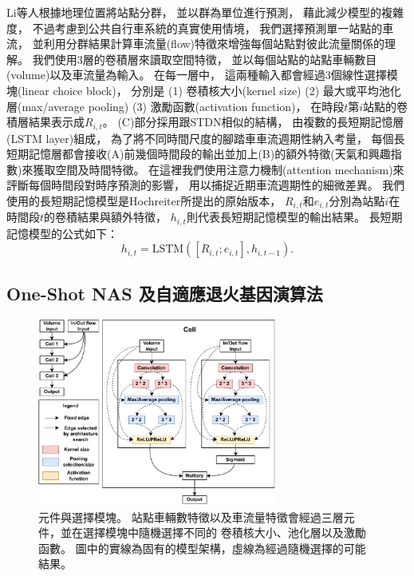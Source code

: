 \documentclass[a4paper,14pt]{extarticle}
\begin{document}
            Li等人\cite{li2015traffic}根據地理位置將站點分群，
            並以群為單位進行預測，
            藉此減少模型的複雜度，
            不過考慮到公共自行車系統的真實使用情境，
            我們選擇預測單一站點的車流，
            並利用分群結果計算車流量(flow)特徵來增強每個站點對彼此流量關係的理解。
            我們使用3層的卷積層來讀取空間特徵，
            並以每個站點的站點車輛數目(volume)以及車流量為輸入。
            在每一層中，
            這兩種輸入都會經過3個線性選擇模塊(linear choice block)，
            分別是 (1) 卷積核大小(kernel size) (2) 最大或平均池化層(max/average pooling) (3) 激勵函數(activation function)，
            在時段$t$第$i$站點的卷積層結果表示成$R_{i,t}$。
            (C)部分採用跟STDN相似的結構，
            由複數的長短期記憶層(LSTM layer)組成，
            為了將不同時間尺度的腳踏車車流週期性納入考量，
            每個長短期記憶層都會接收(A)前幾個時間段的輸出並加上(B)的額外特徵(天氣和興趣指數)來獲取空間及時間特徵。
            在這裡我們使用注意力機制(attention mechanism)來評斷每個時間段對時序預測的影響，
            用以捕捉近期車流週期性的細微差異。
            我們使用的長短期記憶模型是Hochreiter\cite{10.1162/neco.1997.9.8.1735}所提出的原始版本，
            $R_{i,t}$和$e_{i,t}$分別為站點$i$在時間段$t$的卷積結果與額外特徵，
            $h_{i,t}$則代表長短期記憶模型的輸出結果。
            長短期記憶模型的公式如下：
            \begin{equation}
                h_{i,t} = \text{LSTM}([R_{i,t};e_{i,t}],h_{i,t-1}).
            \end{equation}

        \subsection{One-Shot NAS 及自適應退火基因演算法}
            
            \begin{figure}[htb]
                \centering
                \includegraphics[width=0.7\textwidth]{cell.pdf}
                \caption{
                    {\fontsize{12pt}{10pt}\selectfont
                        元件與選擇模塊。
                        站點車輛數特徵以及車流量特徵會經過三層元件，並在選擇模塊中隨機選擇不同的
                        卷積核大小、池化層以及激勵函數。
                        圖中的實線為固有的模型架構，虛線為經過隨機選擇的可能結果。
                    }
                }
                \label{fig:cell}
            \end{figure}
\end{document}
